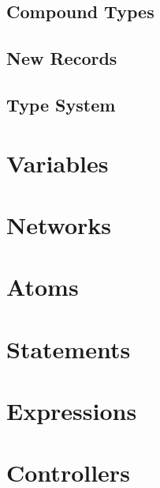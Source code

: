 \subsection{Compound Types}
\subsection{New Records}
\subsection{Type System}

\section{Variables}

\section{Networks}

\section{Atoms}

\section{Statements}

\section{Expressions}

\section{Controllers}
